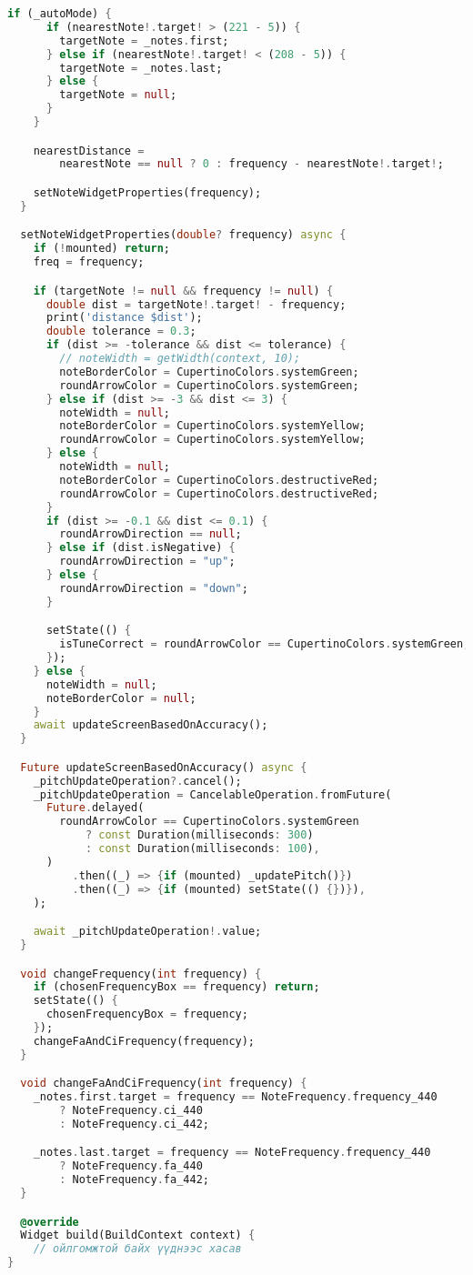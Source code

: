 \begin{lstlisting}[language=Dart, caption=Нүүр хуудас дахь логикийн хэрэгжүүлэлт, frame=single]
    if (_autoMode) {
      if (nearestNote!.target! > (221 - 5)) {
        targetNote = _notes.first;
      } else if (nearestNote!.target! < (208 - 5)) {
        targetNote = _notes.last;
      } else {
        targetNote = null;
      }
    }

    nearestDistance =
        nearestNote == null ? 0 : frequency - nearestNote!.target!;

    setNoteWidgetProperties(frequency);
  }

  setNoteWidgetProperties(double? frequency) async {
    if (!mounted) return;
    freq = frequency;

    if (targetNote != null && frequency != null) {
      double dist = targetNote!.target! - frequency;
      print('distance $dist');
      double tolerance = 0.3;
      if (dist >= -tolerance && dist <= tolerance) {
        // noteWidth = getWidth(context, 10);
        noteBorderColor = CupertinoColors.systemGreen;
        roundArrowColor = CupertinoColors.systemGreen;
      } else if (dist >= -3 && dist <= 3) {
        noteWidth = null;
        noteBorderColor = CupertinoColors.systemYellow;
        roundArrowColor = CupertinoColors.systemYellow;
      } else {
        noteWidth = null;
        noteBorderColor = CupertinoColors.destructiveRed;
        roundArrowColor = CupertinoColors.destructiveRed;
      }
      if (dist >= -0.1 && dist <= 0.1) {
        roundArrowDirection == null;
      } else if (dist.isNegative) {
        roundArrowDirection = "up";
      } else {
        roundArrowDirection = "down";
      }

      setState(() {
        isTuneCorrect = roundArrowColor == CupertinoColors.systemGreen;
      });
    } else {
      noteWidth = null;
      noteBorderColor = null;
    }
    await updateScreenBasedOnAccuracy();
  }

  Future updateScreenBasedOnAccuracy() async {
    _pitchUpdateOperation?.cancel();
    _pitchUpdateOperation = CancelableOperation.fromFuture(
      Future.delayed(
        roundArrowColor == CupertinoColors.systemGreen
            ? const Duration(milliseconds: 300)
            : const Duration(milliseconds: 100),
      )
          .then((_) => {if (mounted) _updatePitch()})
          .then((_) => {if (mounted) setState(() {})}),
    );

    await _pitchUpdateOperation!.value;
  }

  void changeFrequency(int frequency) {
    if (chosenFrequencyBox == frequency) return;
    setState(() {
      chosenFrequencyBox = frequency;
    });
    changeFaAndCiFrequency(frequency);
  }

  void changeFaAndCiFrequency(int frequency) {
    _notes.first.target = frequency == NoteFrequency.frequency_440
        ? NoteFrequency.ci_440
        : NoteFrequency.ci_442;

    _notes.last.target = frequency == NoteFrequency.frequency_440
        ? NoteFrequency.fa_440
        : NoteFrequency.fa_442;
  }

  @override
  Widget build(BuildContext context) {
    // ойлгомжтой байх үүднээс хасав
}

\end{lstlisting}
